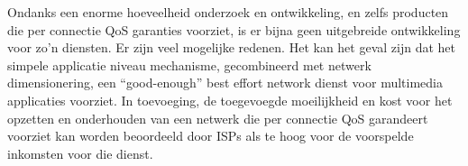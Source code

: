 \noindent Ondanks een enorme hoeveelheid onderzoek en ontwikkeling, en zelfs producten die per connectie QoS garanties voorziet, is er bijna geen uitgebreide ontwikkeling voor zo’n diensten. Er zijn veel mogelijke redenen. Het kan het geval zijn dat het simpele applicatie niveau mechanisme, gecombineerd met netwerk dimensionering, een “good-enough” best effort network dienst voor multimedia applicaties voorziet. In toevoeging, de toegevoegde moeilijkheid en kost voor het opzetten en onderhouden van een netwerk die per connectie QoS garandeert voorziet kan worden beoordeeld door ISPs als te hoog voor de voorspelde inkomsten voor die dienst. 
